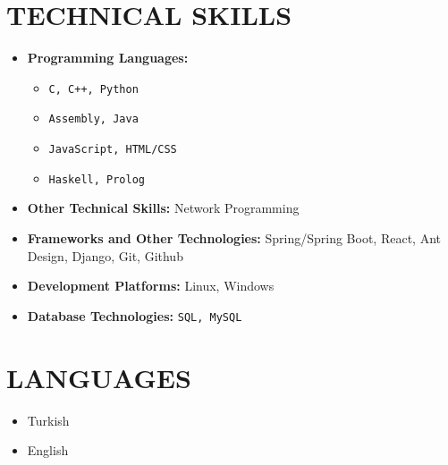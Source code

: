 \begin{minipage}[t]{0.73\textwidth}
  \section{TECHNICAL SKILLS}
    \begin{multicols}{2}
      \begin{itemize}[leftmargin=0.25in, itemsep=1pt]
        \item \textbf{Programming Languages:} 
          \begin{itemize}[label={-}, leftmargin=0.2in]
            \item \texttt{C, C++, Python}
            \item \texttt{Assembly, Java}
            \item \texttt{JavaScript, HTML/CSS}
            \item \texttt{Haskell, Prolog}
          \end{itemize}
        \vspace{\fill}
      
        \item \textbf{Other Technical Skills:}
          Network Programming
      
        \item \textbf{Frameworks and Other Technologies:}
          Spring/Spring Boot, React, Ant Design, Django, Git, Github
        
        \item \textbf{Development Platforms:}
          Linux, Windows
        
        \item \textbf{Database Technologies:} 
          \texttt{SQL, MySQL}
      \end{itemize}
    \end{multicols}
\end{minipage}
\hspace{\fill}
\begin{minipage}[t]{0.22\textwidth}
  \section{LANGUAGES}
    \begin{itemize}[leftmargin=0.25in, itemsep=1pt]
      \item Turkish
      \item English
    \end{itemize}
\end{minipage}
